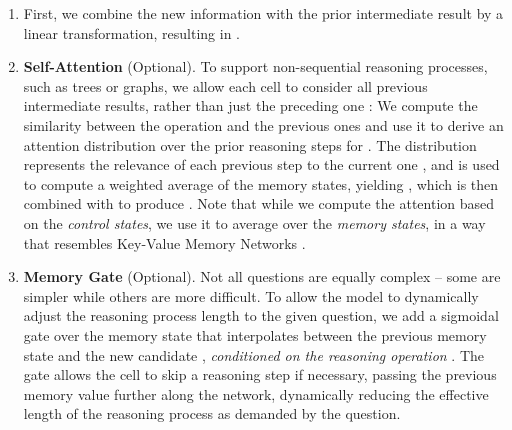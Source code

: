 \documentclass[fleqn]{article}
\begin{document}
\begin{enumerate}
\item First, we combine the new information  with the prior intermediate result  by a linear transformation, resulting in .

\item \textbf{Self-Attention} (Optional). To support non-sequential reasoning processes, such as trees or graphs, we allow each cell to consider all previous intermediate results, rather than just the preceding one : We compute the similarity between the  operation  and the previous ones  and use it to derive an attention distribution over the prior reasoning steps  for . The distribution represents the relevance of each previous step  to the current one , and is used to compute a weighted average of the memory states, yielding , which is then combined with  to produce . Note that while we compute the attention based on the \textit{control states}, we use it to average over the \textit{memory states}, in a way that resembles Key-Value Memory Networks \citep{kvmn}.

\item \textbf{Memory Gate} (Optional). Not all questions are equally complex -- some are simpler while others are more difficult. To allow the model to dynamically adjust the reasoning process length to the given question, we add a sigmoidal gate over the memory state that interpolates between the previous memory state  and the new candidate , \textit{conditioned on the reasoning operation }. The gate allows the cell to skip a reasoning step if necessary, passing the previous memory value further along the network, dynamically reducing the effective length of the reasoning process as demanded by the question.

\end{enumerate}
\end{document}
